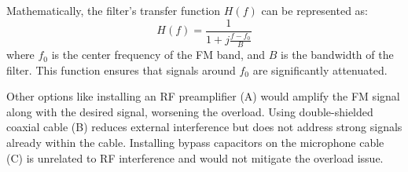 Mathematically, the filter’s transfer function \( H(f) \) can be represented as:
\[
H(f) = \frac{1}{1 + j \frac{f - f_0}{B}}
\]
where \( f_0 \) is the center frequency of the FM band, and \( B \) is the bandwidth of the filter. This function ensures that signals around \( f_0 \) are significantly attenuated.

Other options like installing an RF preamplifier (A) would amplify the FM signal along with the desired signal, worsening the overload. Using double-shielded coaxial cable (B) reduces external interference but does not address strong signals already within the cable. Installing bypass capacitors on the microphone cable (C) is unrelated to RF interference and would not mitigate the overload issue.

